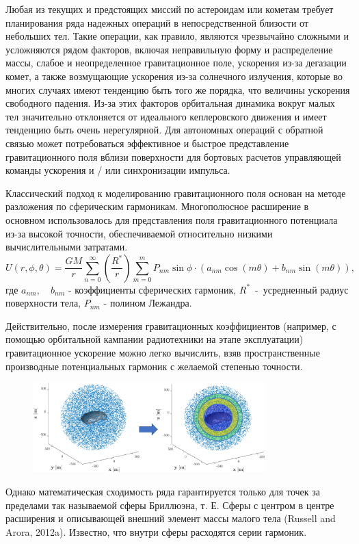 Любая из текущих и предстоящих миссий по астероидам или кометам требует планирования ряда надежных операций в непосредственной близости от небольших тел.
Такие операции, как правило, являются чрезвычайно сложными и усложняются рядом факторов, включая неправильную форму и распределение массы, слабое и неопределенное гравитационное поле, ускорения из-за дегазации комет, а также возмущающие ускорения из-за солнечного излучения, которые во многих случаях имеют тенденцию быть того же порядка, что величины ускорения свободного падения.
Из-за этих факторов орбитальная динамика вокруг малых тел значительно отклоняется от идеального кеплеровского движения и имеет тенденцию быть очень нерегулярной.
Для автономных операций с обратной связью может потребоваться эффективное и быстрое представление гравитационного поля вблизи поверхности для бортовых расчетов управляющей команды ускорения и / или синхронизации импульса.

Классический подход к моделированию гравитационного поля основан на методе разложения по сферическим гармоникам. Многополюсное расширение в основном использовалось для представления поля гравитационного потенциала из-за высокой точности, обеспечиваемой относительно низкими вычислительными затратами.
\[
    U(r,\phi,\theta) = \frac{GM}{r}
        \sum_{n = 0}^{\infty} \left( \frac{R^*}{r}\right)
        \sum_{m = 0}^{m} P_{nm}\sin\phi \cdot (a_{nm}\cos(m\theta) + b_{nm}\sin(m\theta)),
\]
где $a_{nm}, \quad b_{nm}$ - коэффициенты сферических гармоник, $R^*$~-~усредненный радиус поверхности тела, $P_{nm}$ - полином Лежандра.

Действительно, после измерения гравитационных коэффициентов (например, с помощью орбитальной кампании радиотехники на этапе эксплуатации) гравитационное ускорение можно легко вычислить, взяв пространственные производные потенциальных гармоник с желаемой степенью точности.
\begin{figure}[h]
    \centering
    \includegraphics[width=0.8\textwidth]{chapters/tikhonov_s2/images/train_1}
\end{figure}
Однако математическая сходимость ряда гарантируется только для точек за пределами так называемой сферы Бриллюэна, т. Е. Сферы с центром в центре расширения и описывающей внешний элемент массы малого тела (Russell and Arora, 2012a).
Известно, что внутри сферы расходятся серии гармоник.

